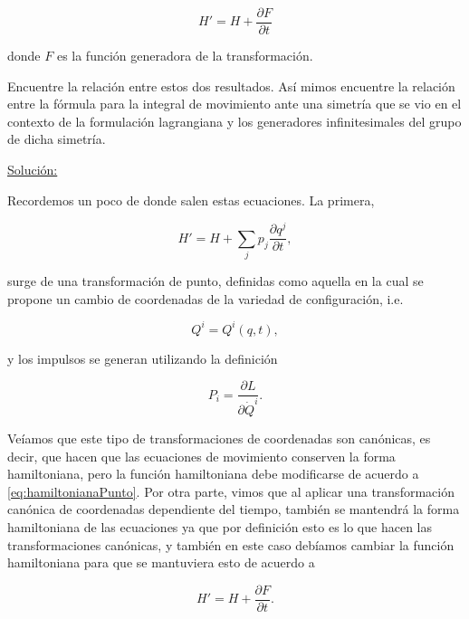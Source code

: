 \documentclass[a4paper,10pt]{article}
\numberwithin{equation}{section}
\begin{document}
$$
H' = H + \frac{\partial F}{\partial t}
$$

donde $F$ es la función generadora de la transformación. 

\vspace{.3cm}

Encuentre la relación entre estos dos resultados. Así mimos encuentre la relación 
entre la fórmula para la integral de movimiento ante una simetría que se vio en el 
contexto de la formulación lagrangiana y los generadores infinitesimales del grupo 
de dicha simetría.

\vspace{.3cm}

\underline{Solución:} \vspace{.3cm}

Recordemos un poco de donde salen estas ecuaciones. La primera,

\begin{equation} 
H' = H + \sum_j p_j \frac{\partial q^j}{\partial t},
\label{eq:hamiltonianaPunto}
\end{equation}

surge de una transformación de punto, definidas como aquella en la cual se propone 
un cambio de coordenadas de la variedad de configuración, i.e. 

\begin{equation}
 Q^i = Q^i(q,t),
\end{equation}

y los impulsos se generan utilizando la definición 

\begin{equation}
P_i = \frac{\partial L}{\partial \dot{Q}^i}.
\end{equation}

Veíamos que este tipo de transformaciones de coordenadas son canónicas, es decir, 
que hacen que las ecuaciones de movimiento conserven la forma hamiltoniana, pero 
la función hamiltoniana debe modificarse de acuerdo a \eqref{eq:hamiltonianaPunto}. 
Por otra parte, vimos que al aplicar una transformación canónica de coordenadas dependiente 
del tiempo, también se mantendrá la forma hamiltoniana de las ecuaciones ya que por 
definición esto es lo que hacen las transformaciones canónicas, y también en este 
caso debíamos cambiar la función hamiltoniana para que se mantuviera esto de acuerdo 
a 

\begin{equation}
 H' = H + \frac{\partial F}{\partial t}.
 \label{eq:hamiltonianaTiempo}
\end{equation}
\end{document}

